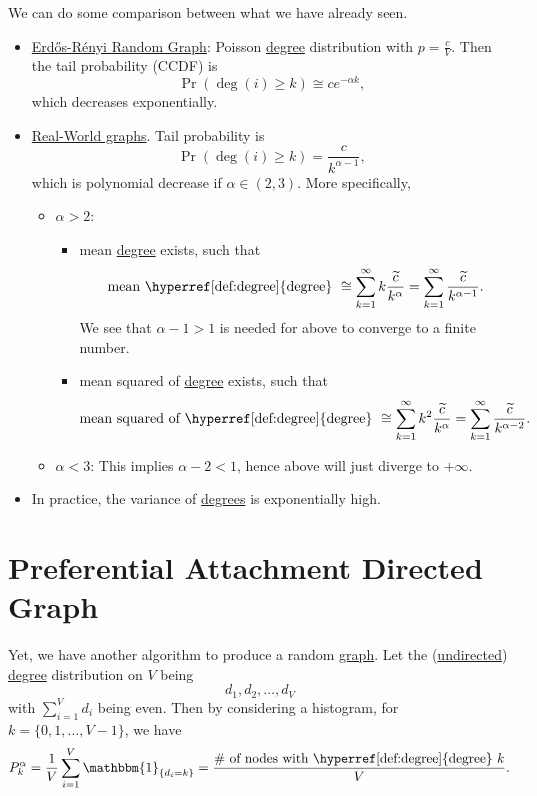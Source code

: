 \begin{remark}
	We can do some comparison between what we have already seen.
	\begin{itemize}
		\item \hyperref[sec:Erdos-Renyi-random-graphs-family]{Erdős-Rényi Random Graph}: Poisson \hyperref[def:degree]{degree} distribution with \(p = \frac{c}{V}\). Then the tail probability (CCDF) is
		      \[
			      \Pr(\deg (i)\geq k)\cong c e^{-\alpha k},
		      \]
		      which decreases exponentially.
		\item \hyperref[sec:real-world-graphs]{Real-World graphs}. Tail probability is
		      \[
			      \Pr(\deg(i) \geq k) = \frac{c}{k^{\alpha - 1}},
		      \]
		      which is polynomial decrease if \(\alpha\in(2, 3)\). More specifically,
		      \begin{itemize}
			      \item \(\alpha>2\):
			            \begin{itemize}
				            \item mean \hyperref[def:degree]{degree} exists, such that
				                  \[
					                  \text{mean \hyperref[def:degree]{degree} }\cong \sum\limits_{k=1}^{\infty} k \frac{\widetilde{c}}{k^{\alpha}} = \sum\limits_{k=1}^{\infty} \frac{\widetilde{c}}{k^{\alpha - 1}}.
				                  \]
				                  We see that \(\alpha - 1 > 1\) is needed for above to converge to a finite number.
				            \item mean squared of \hyperref[def:degree]{degree} exists, such that
				                  \[
					                  \text{mean squared of \hyperref[def:degree]{degree} }\cong \sum\limits_{k=1}^{\infty} k^2 \frac{\widetilde{c}}{k^{\alpha}} = \sum\limits_{k=1}^{\infty} \frac{\widetilde{c}}{k^{\alpha-2}}.
				                  \]
			            \end{itemize}
			      \item \(\alpha<3\): This implies \(\alpha - 2 < 1\), hence above will just diverge to \(+\infty\).
		      \end{itemize}
		\item In practice, the variance of \hyperref[def:degree]{degrees} is exponentially high.
	\end{itemize}
\end{remark}

\section{Preferential Attachment Directed Graph}
Yet, we have another algorithm to produce a random \hyperref[def:graph]{graph}. Let the (\hyperref[def:undirected-graph]{undirected}) \hyperref[def:degree]{degree} distribution on \(V\) being
\[
	d_1, d_2, \dots , d_V
\]
with \(\sum\limits_{i=1}^{V} d_i\) being even. Then by considering a histogram, for \(k = \{0, 1, \dots , V - 1\}\), we have
\[
	P_k^{\alpha} = \frac{1}{V}\sum\limits_{i=1}^{V} \mathbbm{1}_{\{d_i = k\}} = \frac{\#\text{ of nodes with \hyperref[def:degree]{degree} }k}{V}.
\]

